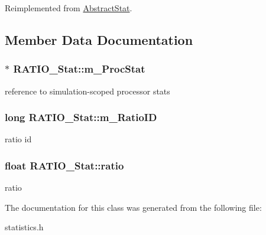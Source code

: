 Reimplemented from \hyperlink{classAbstractStat_aa4760247da47c70d7345de5d881f59cb}{AbstractStat}.



\subsection{Member Data Documentation}
\hypertarget{classRATIO__Stat_a1b31197fd3cb0740bdb32d50c4daec4c}{
\subsubsection[{m\_\-ProcStat}]{$\ast$ {\bf RATIO\_\-Stat::m\_\-ProcStat}}}
\label{classRATIO__Stat_a1b31197fd3cb0740bdb32d50c4daec4c}
reference to simulation-\/scoped processor stats \hypertarget{classRATIO__Stat_ad9389292fb4a07b1c5495e4e25ba0ecc}{
\subsubsection[{m\_\-RatioID}]{\setlength{\rightskip}{0pt plus 5cm}long {\bf RATIO\_\-Stat::m\_\-RatioID}}}
\label{classRATIO__Stat_ad9389292fb4a07b1c5495e4e25ba0ecc}
ratio id \hypertarget{classRATIO__Stat_acf9ee3f1943b126e2d824117de380a28}{
\subsubsection[{ratio}]{\setlength{\rightskip}{0pt plus 5cm}float {\bf RATIO\_\-Stat::ratio}}}
\label{classRATIO__Stat_acf9ee3f1943b126e2d824117de380a28}
ratio 

The documentation for this class was generated from the following file:\begin{DoxyCompactItemize}
\item 
statistics.h\end{DoxyCompactItemize}
